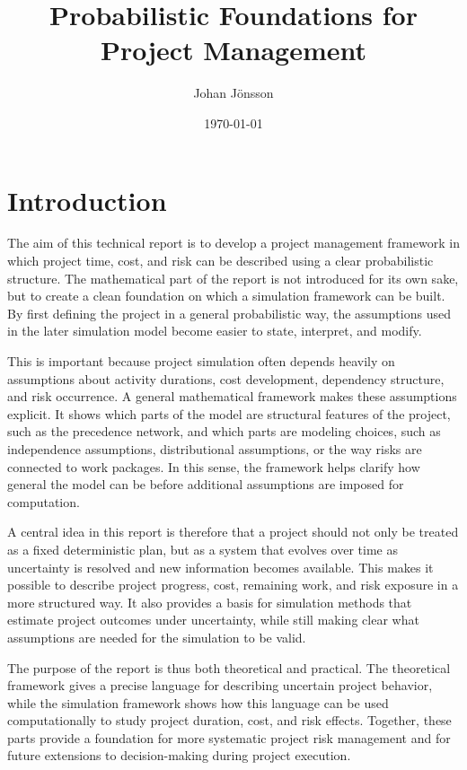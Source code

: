 \documentclass[11pt,a4paper]{article}
\title{Probabilistic Foundations for Project Management}
\author{Johan Jönsson}
\date{\today}
\newcommand{\1}{\mathbf{1}}
\theoremstyle{definition}
\theoremstyle{plain}
\theoremstyle{remark}
\numberwithin{equation}{section}
\begin{document}
\maketitle



\tableofcontents
\newpage

\section{Introduction}

The aim of this technical report is to develop a project management framework in which project time, cost, and risk can be described using a clear probabilistic structure. The mathematical part of the report is not introduced for its own sake, but to create a clean foundation on which a simulation framework can be built. By first defining the project in a general probabilistic way, the assumptions used in the later simulation model become easier to state, interpret, and modify.

This is important because project simulation often depends heavily on assumptions about activity durations, cost development, dependency structure, and risk occurrence. A general mathematical framework makes these assumptions explicit. It shows which parts of the model are structural features of the project, such as the precedence network, and which parts are modeling choices, such as independence assumptions, distributional assumptions, or the way risks are connected to work packages. In this sense, the framework helps clarify how general the model can be before additional assumptions are imposed for computation.

A central idea in this report is therefore that a project should not only be treated as a fixed deterministic plan, but as a system that evolves over time as uncertainty is resolved and new information becomes available. This makes it possible to describe project progress, cost, remaining work, and risk exposure in a more structured way. It also provides a basis for simulation methods that estimate project outcomes under uncertainty, while still making clear what assumptions are needed for the simulation to be valid.

The purpose of the report is thus both theoretical and practical. The theoretical framework gives a precise language for describing uncertain project behavior, while the simulation framework shows how this language can be used computationally to study project duration, cost, and risk effects. Together, these parts provide a foundation for more systematic project risk management and for future extensions to decision-making during project execution.
\end{document}
